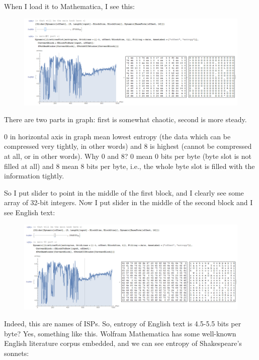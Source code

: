 When I load it to Mathematica, I see this:

\begin{figure}[H]
\centering
\includegraphics[scale=\FigScale]{ff/entropy/geoipisp1.png}
\end{figure}

There are two parts in graph: first is somewhat chaotic, second is more steady.

0 in horizontal axis in graph mean lowest entropy (the data which can be compressed very tightly,  in other words) 
and 8 is highest (cannot be compressed at all,  or  in other words).
Why 0 and 8? 0 mean 0 bits per byte (byte slot is not filled at all) 
and 8 mean 8 bits per byte, i.e., the whole byte slot is filled with the information tightly.

So I put slider to point in the middle of the first block, and I clearly see some array of 32-bit integers.
Now I put slider in the middle of the second block and I see English text:

\begin{figure}[H]
\centering
\includegraphics[scale=\FigScale]{ff/entropy/geoipisp2.png}
\end{figure}

Indeed, this are names of ISPs.
So, entropy of English text is 4.5-5.5 bits per byte? Yes, something like this.
Wolfram Mathematica has some well-known English literature corpus embedded, and we can see entropy of Shakespeare's sonnets:

